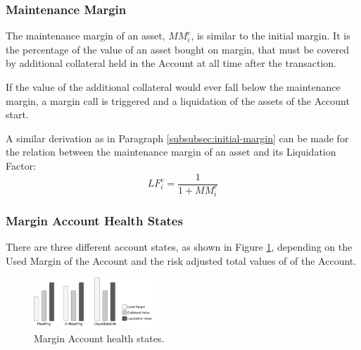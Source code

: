 \documentclass[sigconf,nonacm]{acmart}
\begin{document}
\subsubsection{Maintenance Margin}
The maintenance margin of an asset, $MM_{i}^{c}$, is similar to the initial margin.
It is the percentage of the value of an asset bought on margin, that must be covered by additional collateral held in the Account at all time after the transaction.

If the value of the additional collateral would ever fall below the maintenance margin, a margin call is triggered and a liquidation of the assets of the Account start.

A similar derivation as in Paragraph \ref{subsubsec:initial-margin} can be made for the relation between the maintenance margin of an asset and its Liquidation Factor:
\begin{equation}
    LF_{i}^{c} = \frac{1}{1 + MM_{i}^{c}}
\end{equation}

\subsubsection{Margin Account Health States}
\label{subsubsec:margin-account-health-states}
There are three different account states, as shown in Figure \ref{fig:health-states},
depending on the Used Margin of the Account and the risk adjusted total values of of the Account.

\begin{figure}
    \centering
    \includegraphics[width=0.4\textwidth]{images/Health-States.png}
    \caption{Margin Account health states. \label{fig:health-states}}
\end{figure}
\end{document}
